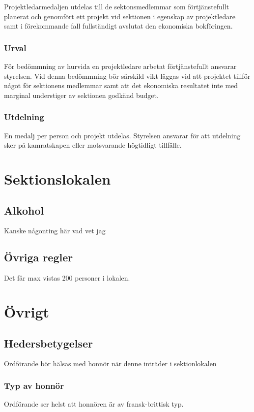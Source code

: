 \documentclass{../resources/dgovdoc}
\begin{document}
Projektledarmedaljen utdelas till de sektonsmedlemmar som förtjänstefullt planerat och genomfört ett projekt vid sektionen i egenskap av projektledare samt i förekommande fall fullständigt avslutat den ekonomiska bokföringen. 

\subsubsection{Urval}

För bedömmning av hurvida en projektledare arbetat förtjänstefullt ansvarar styrelsen. Vid denna bedömmning bör särskild vikt läggas vid att projektet tillför något för sektionens medlemmar samt att det ekonomiska resultatet inte med marginal understiger av sektionen godkänd budget. 

\subsubsection{Utdelning}

En medalj per person och projekt utdelas. Styrelsen ansvarar för att utdelning sker på kamratskapen eller motsvarande högtidligt tillfälle.

\section{Sektionslokalen}

\subsection{Alkohol}
Kanske någonting här vad vet jag

\subsection{Övriga regler}

Det får max vistas 200 personer i lokalen. 

\section{Övrigt}

\subsection{Hedersbetygelser}

Ordförande bör hälsas med honnör när denne inträder i sektionlokalen

\subsubsection{Typ av honnör}

Ordförande ser helst att honnören är av fransk-brittisk typ.
\end{document}
